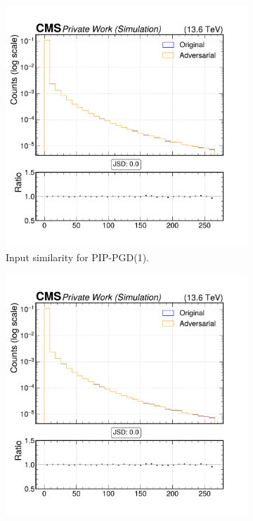 \begin{figure}[h]
  \centering
  \begin{subfigure}[t]{0.32\textwidth}
    \includegraphics[width=\linewidth]{media/output/features/compare/combined_it_1/cmp_vtx_arr_sv_dxysig.pdf}
    \caption*{Input similarity for PIP-PGD(1).}
  \end{subfigure}\hfill
  \begin{subfigure}[t]{0.32\textwidth}
    \includegraphics[width=\linewidth]{media/output/features/compare/combined_it_2/cmp_vtx_arr_sv_dxysig.pdf}

\end{subfigure}
\end{figure}
